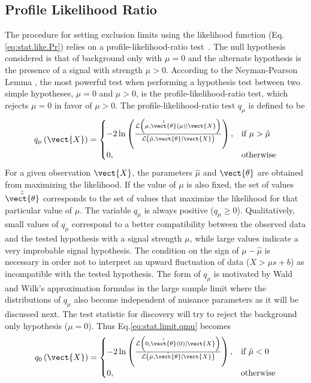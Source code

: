 \subsection{Profile Likelihood Ratio}

The procedure for setting exclusion limits using the likelihood function 
(Eq.\ref{eq:stat.like.Pr})
relies on a profile-likelihood-ratio test~\cite{Cowan:2010js}.
The null hypothesis considered is that of background only with $\mu=0$ and the alternate hypothesis 
is the presence of a signal with strength $\mu>0$.
According to the Neyman-Pearson Lemma \cite{Neyman289}, 
the most powerful test when performing a hypothesis test between two simple hypotheses, $\mu=0$ and $\mu>0$,
is the profile-likelihood-ratio test, which rejects $\mu=0$ in favor of $\mu>0$.
The profile-likelihood-ratio test $q_{\mu}$ is defined to be
\begin{equation}
q_{\mu}  \left( \vect{X} \right)= 
\begin{cases}
  -2\ln\left(
  \frac
      {\mathcal{L} \left( \mu, \hat{\hat{\vect{\theta}}}\left(\mu\right) \rvert \vect{X} \right)}
      {\mathcal{L} \left( \hat{\mu}, \hat{\vect{\theta}} \rvert \vect{X} \right)}
 \right), & \text{if}\ \mu > \hat{\mu} \\
      0, & \text{otherwise}
    \end{cases}
\label{eq:stat.limit.qmu}
\end{equation}
For a given observation $\vect{X}$, the parameters $\hat{\mu}$ and $\vect{\theta}$ are obtained from maximizing the likelihood. 
If the value of $\mu$ is also fixed, the set of values $\hat{\hat{\vect{\theta}}}$ corresponds to the set of values that 
maximize the likelihood for that particular value of $\mu$. The variable $q_{\mu}$ is always positive ($q_{\mu}\geq0$).
Qualitatively, small values of $q_{\mu}$ correspond to a better compatibility between the observed data and the 
tested hypothesis with a signal strength $\mu$, while large values indicate a very improbable signal hypothesis.
The condition on the sign of $ \mu - \hat{\mu}$ is necessary in order not to interpret an upward fluctuation of data 
($X > \mu s + b$) as incompatible with the tested hypothesis. 
The form of $q_{\mu}$ is motivated by Wald and Wilk's \cite{Wilks:1938dza,Wald:ams1943} approximation formulas in the large sample limit
where the distributions of $q_{\mu}$ also become independent of nuisance parameters as it will be discussed next.
The test statistic for discovery will try to reject the background only hypothesis ($\mu=0$). Thus Eq.\ref{eq:stat.limit.qmu} becomes
\begin{equation}
q_{0}  \left( \vect{X} \right)= 
\begin{cases}
  -2\ln\left(
  \frac
      {\mathcal{L} \left( 0, \hat{\hat{\vect{\theta}}}\left(0\right) \rvert \vect{X} \right)}
      {\mathcal{L} \left( \hat{\mu}, \hat{\vect{\theta}} \rvert \vect{X} \right)}
 \right), & \text{if}\ \hat{\mu} < 0 \\
      0, & \text{otherwise}
    \end{cases}
\end{equation}

